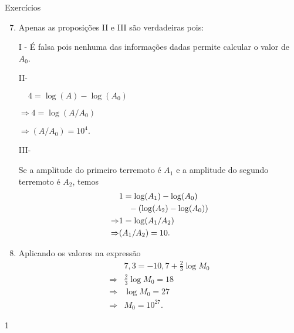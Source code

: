 \begin{answer}{Exercícios}
{\exerciselist
\begin{enumerate}\setcounter{enumi}{6}
\item Apenas as proposições II e III são verdadeiras pois:

I - É falsa pois nenhuma das informações dadas permite calcular o valor de $A_0$.

II- \hspace{30mm}\begin{minipage}[t]{0.5\linewidth}
$\,\,\,\,\,\,\,4 = \log (A) - \log (A_0)$

$\Rightarrow 4 = \log (A/A_0)$

$\Rightarrow (A/A_0) = 10^4.$
\end{minipage}

III- \begin{minipage}[t]{0.8\linewidth}
Se a amplitude do primeiro terremoto é $A_1$ e a amplitude do segundo terremoto é $A_2$, temos
\begin{align*}
&1 = \log (A_1) - \log (A_0)\\
& \hspace{4mm}- (\log (A_2) - \log (A_0))\\
\Rightarrow &1 = \log (A_1/A_2)\\
\Rightarrow &(A_1/A_2) = 10.
\end{align*}
\end{minipage}

\item Aplicando os valores na expressão
\begin{align*}
&7{,}3 = -10{,}7+\frac{2}{3} \log M_0\\
\Rightarrow & \frac{2}{3} \log M_0 = 18\\
\Rightarrow & \log M_0 = 27\\
\Rightarrow & M_0 = 10^{27}.
\end{align*}
\end{enumerate}
}{1}
\end{answer}
\clearmargin
